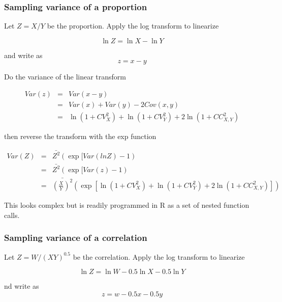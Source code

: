 \documentclass[titlepage]{article}  %
\begin{document}
\subsubsection{Sampling variance of a proportion}

Let $Z = X/Y$ be the proportion. Apply the log transform to linearize

\begin{displaymath}
\ln Z = \ln X - \ln Y
\end{displaymath}
 
and write as
\begin{displaymath}
z = x - y
\end{displaymath}

Do the variance of the linear transform


\begin{eqnarray*}
Var(z) & = & Var(x-y) \\
       & = & Var(x) + Var(y) - 2Cov(x,y) \\
       & = & \ln(1 + CV^{2}_{X}) + \ln(1 + CV^{2}_{Y}) + 2 \ln(1 + CC^{2}_{X,Y})
\end{eqnarray*}

then reverse the transform with the exp function

\begin{eqnarray*}
Var(Z) & = & \bar{Z^{2}}(\exp[Var(lnZ) - 1) \\
       & = & \bar{Z^{2}}(\exp[Var(z) - 1) \\
       & = & \bar{(\frac{X}{Y})^{2}}(\exp[\ln(1+CV^{2}_{X}) + \ln(1 + CV^{2}_{Y}) + 2 \ln(1 + CC^{2}_{X,Y})])
\end{eqnarray*}

This looks complex but is readily programmed in R as a set of nested function calls.


\subsubsection{Sampling variance of a correlation}
 
Let $Z = W/(XY)^{0.5}$ be the correlation. Apply the log transform to linearize

\begin{displaymath}
\ln Z = \ln W - 0.5 \ln X - 0.5 \ln Y
\end{displaymath}

nd write as
\begin{displaymath}
z = w - 0.5 x - 0.5 y
\end{displaymath}
\end{document}
